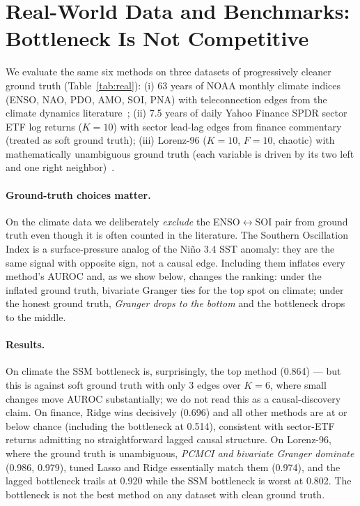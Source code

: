 \documentclass{article}
\begin{document}
\section{Real-World Data and Benchmarks: Bottleneck Is Not Competitive}
\label{sec:realdata}

We evaluate the same six methods on three datasets of progressively
cleaner ground truth (Table~\ref{tab:real}):
(i) 63 years of NOAA monthly climate indices
(ENSO, NAO, PDO, AMO, SOI, PNA) with teleconnection edges from the
climate dynamics literature~\citep{trenberth1994decadal,delworth2000observed,newman2016pdo};
(ii) 7.5 years of daily Yahoo Finance SPDR sector ETF log returns
($K{=}10$) with sector lead-lag edges from finance commentary (treated
as soft ground truth);
(iii) Lorenz-96 ($K{=}10$, $F{=}10$, chaotic) with mathematically
unambiguous ground truth (each variable is driven by its two left
and one right neighbor)~\citep{tank2021neural,nauta2019causal}.

\paragraph{Ground-truth choices matter.} On the climate data we
deliberately \emph{exclude} the ENSO$\leftrightarrow$SOI pair from
ground truth even though it is often counted in the literature. The
Southern Oscillation Index is a surface-pressure analog of the Niño
3.4 SST anomaly: they are the same signal with opposite sign, not a
causal edge. Including them inflates every method's AUROC and, as we
show below, changes the ranking: under the inflated ground truth,
bivariate Granger ties for the top spot on climate; under the
honest ground truth, \emph{Granger drops to the bottom} and the
bottleneck drops to the middle.

\paragraph{Results.} On climate the SSM bottleneck is, surprisingly,
the top method (0.864) — but this is against soft ground truth
with only 3 edges over $K{=}6$, where small changes move AUROC
substantially; we do not read this as a causal-discovery claim. On
finance, Ridge wins decisively (0.696) and all other methods are at
or below chance (including the bottleneck at 0.514), consistent with
sector-ETF returns admitting no straightforward lagged causal
structure. On Lorenz-96, where the ground truth is unambiguous,
\emph{PCMCI and bivariate Granger dominate} (0.986, 0.979), tuned
Lasso and Ridge essentially match them (0.974), and the lagged
bottleneck trails at 0.920 while the SSM bottleneck is worst at
0.802. The bottleneck is not the best method on any dataset with
clean ground truth.
\end{document}
